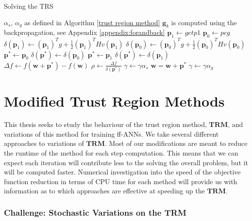 \documentclass[letterpaper,12pt,titlepage,oneside,final]{book}
\begin{document}
	\begin{algorithm}
		\caption{Solving the TRS}\label{algorithm:trs}
		\begin{algorithmic}[1]
			\State $\alpha_{s}$, $\alpha_{g}$ as defined in Algorithm \ref{trust region method} 
			\State $\mathbf{g}_{k}$ is computed using the backpropagation, see Appendix \ref{appendix:forandback}
			\State $\mathbf{p}_{1} \gets getp1$
			\State $\mathbf{p}_{0} \gets pcg$     
			\State $\delta(\mathbf{p}_{1}) \gets (\mathbf{p}_{1})^{T}g + \frac{1}{2}(\mathbf{p}_{1})^{T}Hv(\mathbf{p}_{1})$
			\State $\delta(\mathbf{p}_{0}) \gets (\mathbf{p}_{0})^{T}g + \frac{1}{2}(\mathbf{p}_{0})^{T}Hv(\mathbf{p}_{0})$
			\State $\mathbf{p}^{*} \gets \mathbf{p}_{0}$
			\State $\delta(\mathbf{p}^{*}) \gets \delta(\mathbf{p}_{0})$
			\Else
			\State $\mathbf{p}^{*} \gets \mathbf{p}_{1}$
			\State $\delta(\mathbf{p}^{*}) \gets \delta(\mathbf{p}_{1})$
			\EndIf
			\State $\Delta f \gets f(\mathbf{w} + \mathbf{p}^{*}) - f(\mathbf{w})$
			\State $\rho \gets \frac{\Delta f}{\delta(\mathbf{p}^{*})}$
			\State $\gamma \gets \gamma \alpha_{s}$
			\Else 
			\State $\mathbf{w} = \mathbf{w} + \mathbf{p}^{*}$
			\State $\gamma \gets \gamma \alpha_{g}$
			\EndIf
			\EndIf
			\EndProcedure
		\end{algorithmic}
	\end{algorithm}
	 
	\chapter{Modified Trust Region Methods}
	
	This thesis seeks to study the behaviour of the trust region method, $\mathbf{TRM}$, and variations of this method for training ff-ANNs. We take several different approaches to variations of $\mathbf{TRM}$. Most of our modifications are meant to reduce the runtime of the method for each step computation. This means that we can expect each iteration will contribute less to the solving the overall problem, but it will be computed faster. Numerical investigation into the speed of the objective function reduction in terms of CPU time for each method will provide us with information as to which approaches are effective at speeding up the $\mathbf{TRM}$.
	
	\subsection{Challenge: Stochastic Variations on the \textbf{TRM}}
	
\end{document}
